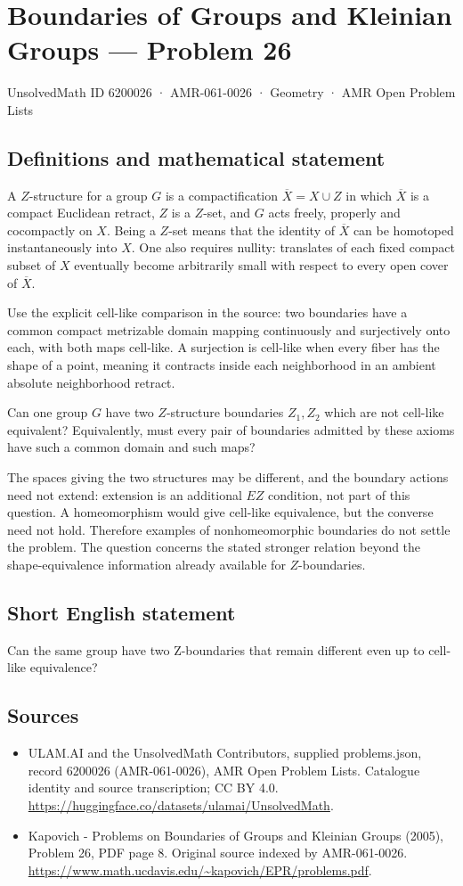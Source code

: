 \documentclass[11pt,a4paper]{article}
\begin{document}
\section*{Boundaries of Groups and Kleinian Groups — Problem 26}\label{6200026}
{\small UnsolvedMath ID 6200026 · AMR-061-0026 · Geometry · AMR Open Problem Lists}
\subsection{Definitions and mathematical statement}
A $Z$-structure for a group $G$ is a compactification $\overline X=X\cup Z$ in which $\overline X$ is a compact Euclidean retract, $Z$ is a $Z$-set, and $G$ acts freely, properly and cocompactly on $X$. Being a $Z$-set means that the identity of $\overline X$ can be homotoped instantaneously into $X$. One also requires nullity: translates of each fixed compact subset of $X$ eventually become arbitrarily small with respect to every open cover of $\overline X$.

Use the explicit cell-like comparison in the source: two boundaries have a common compact metrizable domain mapping continuously and surjectively onto each, with both maps cell-like. A surjection is cell-like when every fiber has the shape of a point, meaning it contracts inside each neighborhood in an ambient absolute neighborhood retract.

Can one group $G$ have two $Z$-structure boundaries $Z_1,Z_2$ which are not cell-like equivalent? Equivalently, must every pair of boundaries admitted by these axioms have such a common domain and such maps?

The spaces giving the two structures may be different, and the boundary actions need not extend: extension is an additional $EZ$ condition, not part of this question. A homeomorphism would give cell-like equivalence, but the converse need not hold. Therefore examples of nonhomeomorphic boundaries do not settle the problem. The question concerns the stated stronger relation beyond the shape-equivalence information already available for $Z$-boundaries.
\subsection{Short English statement}
Can the same group have two Z-boundaries that remain different even up to cell-like equivalence?
\subsection{Sources}
\begin{itemize}
\item[S1] ULAM.AI and the UnsolvedMath Contributors, supplied problems.json, record 6200026 (AMR-061-0026), AMR Open Problem Lists. Catalogue identity and source transcription; CC BY 4.0.
\url{https://huggingface.co/datasets/ulamai/UnsolvedMath}.
\item[S2] Kapovich - Problems on Boundaries of Groups and Kleinian Groups (2005), Problem 26, PDF page 8. Original source indexed by AMR-061-0026.
\url{https://www.math.ucdavis.edu/~kapovich/EPR/problems.pdf}.
\end{itemize}
\end{document}
